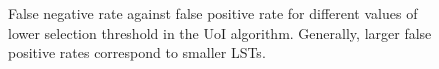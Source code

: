 \documentclass[11pt]{article}
\begin{document}
\begin{figure}[ht]
	\centering
	\caption{False negative rate against false positive rate for different values of lower selection threshold in the UoI algorithm. Generally, larger false positive rates correspond to smaller LSTs.}
	\label{fig:exp2-roc}
\end{figure}
\end{document}

